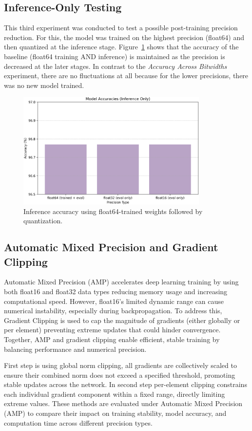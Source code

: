 \documentclass[11pt]{article}
\begin{document}
\subsection*{Inference-Only Testing}
This third experiment was conducted to test a possible post-training precision
reduction. For this, the model was trained on the highest precision (float64)
and then quantized at the inference stage.
Figure~\ref{fig:inferenceOnlyTesting} shows that the accuracy of the baseline
(float64 training AND inference) is maintained as the precision is decreased at
the later stages. In contrast to the \textit{Accuracy Across Bitwidths}
experiment, there are no fluctuations at all because for the lower precisions,
there was no new model trained.
\begin{figure}[H]
	\centering
	\includegraphics[width=0.85\textwidth]{figures/inferenceOnly.png}
	\caption{Inference accuracy using float64-trained weights followed by quantization.}\label{fig:inferenceOnlyTesting}
\end{figure}

\subsection*{Automatic Mixed Precision and Gradient Clipping}
Automatic Mixed Precision (AMP) accelerates deep learning training by using
both float16 and float32 data types reducing memory usage and increasing
computational speed. However, float16’s limited dynamic range can cause
numerical instability, especially during backpropagation. To address this,
Gradient Clipping is used to cap the magnitude of gradients (either globally or
per element) preventing extreme updates that could hinder convergence.
Together, AMP and gradient clipping enable efficient, stable training by
balancing performance and numerical precision.

First step is using global norm clipping, all gradients are collectively scaled
to ensure their combined norm does not exceed a specified threshold, promoting
stable updates across the network. In second step per-element clipping
constrains each individual gradient component within a fixed range, directly
limiting extreme values. These methods are evaluated under Automatic Mixed
Precision (AMP) to compare their impact on training stability, model accuracy,
and computation time across different precision types.
\end{document}
